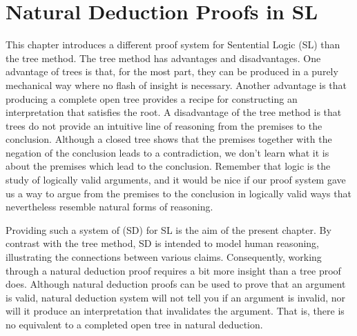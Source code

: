 \chapter{Natural Deduction Proofs in SL}
\label{ch.ND.proofs}


This chapter introduces a different proof system for Sentential Logic (SL) than the tree method.
The tree method has advantages and disadvantages.
One advantage of trees is that, for the most part, they can be produced in a purely mechanical way where no flash of insight is necessary.
Another advantage is that producing a complete open tree provides a recipe for constructing an interpretation that satisfies the root.
A disadvantage of the tree method is that trees do not provide an intuitive line of reasoning from the premises to the conclusion. 
Although a closed tree shows that the premises together with the negation of the conclusion leads to a contradiction, we don't learn what it is about the premises which lead to the conclusion.
Remember that logic is the study of logically valid arguments, and it would be nice if our proof system gave us a way to argue from the premises to the conclusion in logically valid ways that nevertheless resemble natural forms of reasoning.

Providing such a system of  (SD) for SL is the aim of the present chapter.
By contrast with the tree method, SD is intended to model human reasoning, illustrating the connections between various claims.
Consequently, working through a natural deduction proof requires a bit more insight than a tree proof does.
Although natural deduction proofs can be used to prove that an argument is valid, natural deduction system will not tell you if an argument is invalid, nor will it produce an interpretation that invalidates the argument.
That is, there is no equivalent to a completed open tree in natural deduction.

